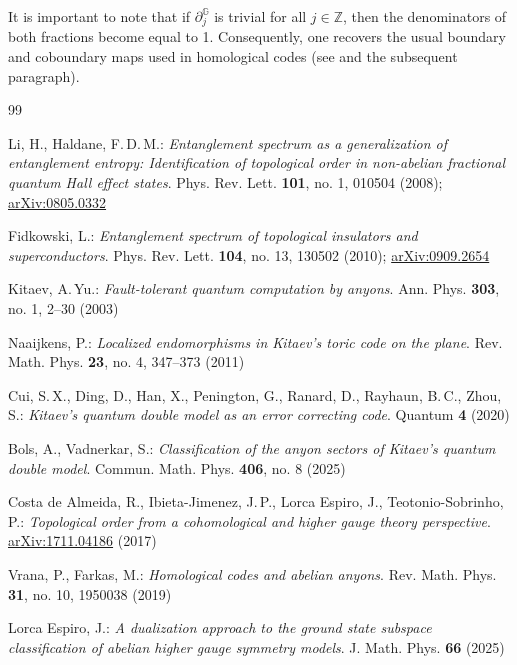 \documentclass[a4paper,12pt,twoside,reqno]{amsart}
\theoremstyle{plain}
\theoremstyle{definition}
\theoremstyle{remark}
\numberwithin{equation}{section}
\numberwithin{figure}{section}
\numberwithin{table}{section}
\newcommand{\eprint}[1]{\href{https://arxiv.org/abs/#1}{arXiv:#1}}
\newcommand{\ZZ}{\mathbb{Z}}
\newcommand{\n}[1]{\mathbb{#1}}
\begin{document}
	
	\medskip
	
	
	It is important to note that if $\partial^\n{G}_j$ is trivial for all $j \in \ZZ$, then the denominators of both fractions become equal to 1. Consequently, one recovers the usual boundary and coboundary maps used in homological codes (see   \cite[eq. (4.13)]{Vrana} and the subsequent paragraph).
	
	
	
	
	
	
	
	
	
	\begin{thebibliography}{99}
		
		Li, H., Haldane, F.\,D.\,M.:
		{\sl Entanglement spectrum as a generalization of entanglement entropy: Identification of topological order in non-abelian fractional quantum Hall effect states}.
		Phys. Rev. Lett. {\bf 101}, no. 1, 010504 (2008); \eprint{0805.0332}
		
		Fidkowski, L.:
		{\sl Entanglement spectrum of topological insulators and superconductors}.
		Phys. Rev. Lett. {\bf 104}, no. 13, 130502 (2010); \eprint{0909.2654}
		
		Kitaev, A.\,Yu.:
		{\sl Fault-tolerant quantum computation by anyons}.
		Ann. Phys. {\bf 303}, no. 1, 2--30 (2003)
		
		Naaijkens, P.:
		{\sl Localized endomorphisms in Kitaev's toric code on the plane}.
		Rev. Math. Phys. {\bf 23}, no. 4, 347--373 (2011)
		
		Cui, S.\,X., Ding, D., Han, X., Penington, G., Ranard, D., Rayhaun, B.\,C., Zhou, S.:
		{\sl Kitaev's quantum double model as an error correcting code}.
		Quantum {\bf 4} (2020)
		
		Bols, A., Vadnerkar, S.:
		{\sl Classification of the anyon sectors of Kitaev's quantum double model}.
		Commun. Math. Phys. {\bf 406}, no. 8 (2025)
		
		Costa de Almeida, R., Ibieta-Jimenez, J.\,P., Lorca Espiro, J., Teotonio-Sobrinho, P.:
		{\sl Topological order from a cohomological and higher gauge theory perspective}.
		\eprint{1711.04186} (2017)
		
		Vrana, P., Farkas, M.:
		{\sl Homological codes and abelian anyons}.
		Rev. Math. Phys. {\bf 31}, no. 10, 1950038 (2019)
		
		Lorca Espiro, J.:
		{\sl A dualization approach to the ground state subspace classification of abelian higher gauge symmetry models}.
		J. Math. Phys. {\bf 66} (2025)
		

\end{thebibliography}
\end{document}
